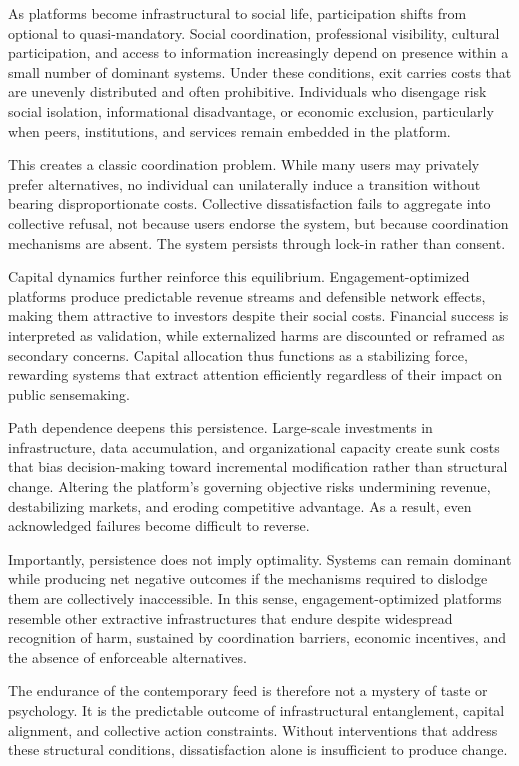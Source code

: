\documentclass[12pt]{article}
\begin{document}
As platforms become infrastructural to social life, participation shifts from optional to quasi-mandatory. Social coordination, professional visibility, cultural participation, and access to information increasingly depend on presence within a small number of dominant systems. Under these conditions, exit carries costs that are unevenly distributed and often prohibitive. Individuals who disengage risk social isolation, informational disadvantage, or economic exclusion, particularly when peers, institutions, and services remain embedded in the platform.

This creates a classic coordination problem. While many users may privately prefer alternatives, no individual can unilaterally induce a transition without bearing disproportionate costs. Collective dissatisfaction fails to aggregate into collective refusal, not because users endorse the system, but because coordination mechanisms are absent. The system persists through lock-in rather than consent.

Capital dynamics further reinforce this equilibrium. Engagement-optimized platforms produce predictable revenue streams and defensible network effects, making them attractive to investors despite their social costs. Financial success is interpreted as validation, while externalized harms are discounted or reframed as secondary concerns. Capital allocation thus functions as a stabilizing force, rewarding systems that extract attention efficiently regardless of their impact on public sensemaking.

Path dependence deepens this persistence. Large-scale investments in infrastructure, data accumulation, and organizational capacity create sunk costs that bias decision-making toward incremental modification rather than structural change. Altering the platform’s governing objective risks undermining revenue, destabilizing markets, and eroding competitive advantage. As a result, even acknowledged failures become difficult to reverse.

Importantly, persistence does not imply optimality. Systems can remain dominant while producing net negative outcomes if the mechanisms required to dislodge them are collectively inaccessible. In this sense, engagement-optimized platforms resemble other extractive infrastructures that endure despite widespread recognition of harm, sustained by coordination barriers, economic incentives, and the absence of enforceable alternatives.

The endurance of the contemporary feed is therefore not a mystery of taste or psychology. It is the predictable outcome of infrastructural entanglement, capital alignment, and collective action constraints. Without interventions that address these structural conditions, dissatisfaction alone is insufficient to produce change.
\end{document}
